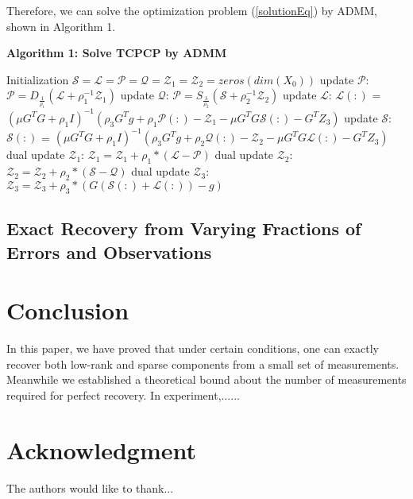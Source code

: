 \documentclass[journal,transmag]{IEEEtran}
\theoremstyle{plain}
\begin{document}
Therefore, we can solve the optimization problem (\ref{solutionEq}) by ADMM, shown in Algorithm 1.
\begin{algorithm}[!htbp]
  \caption*{\textbf{Algorithm 1: Solve TCPCP by ADMM}}
  \begin{algorithmic}[1]
    \State Initialization $\mathcal{S}=\mathcal{L}=\mathcal{P}=\mathcal{Q}=\mathcal{Z}_1=\mathcal{Z}_2=zeros(dim(X_0))$
        \State update $\mathcal{P}$: $\mathcal{P}=D_{\frac{1}{\rho_1}}(\mathcal{L}+\rho_1^{-1}\mathcal{Z}_1)$
        \State update $\mathcal{Q}$: $\mathcal{P}=S_{\frac{\lambda}{\rho_2}}(\mathcal{S}+\rho_2^{-1}\mathcal{Z}_2)$
        \State update $\mathcal{L}$: $\mathcal{L}(:)$ = $(\mu G^TG+\rho_1I)^{-1}
                                                (\rho_3 G^T g+\rho_1\mathcal{P}(:)-\mathcal{Z}_1-\mu G^TG\mathcal{S}(:)-G^TZ_3)$
        \State update $\mathcal{S}$: $\mathcal{S}(:)$ = $(\mu G^TG+\rho_1I)^{-1}
                                                (\rho_3 G^T g+\rho_2\mathcal{Q}(:)-\mathcal{Z}_2-\mu G^TG\mathcal{L}(:)-G^TZ_3)$
        \State dual update $\mathcal{Z}_1$: $\mathcal{Z}_1=\mathcal{Z}_1+\rho_1*(\mathcal{L-P})$
        \State dual update $\mathcal{Z}_2$: $\mathcal{Z}_2=\mathcal{Z}_2+\rho_2*(\mathcal{S-Q})$
        \State dual update $\mathcal{Z}_3$: $\mathcal{Z}_3=\mathcal{Z}_3+\rho_3*(G\mathcal{(S(:)+L(:))}-g)$
    \EndFor
  \end{algorithmic}
\end{algorithm}

\subsection{Exact Recovery from Varying Fractions of Errors and Observations}
\section{Conclusion}
In this paper, we have proved that under certain conditions, one can exactly recover both low-rank and sparse components from a small set of measurements. Meanwhile we established a theoretical bound about the number of measurements required for perfect recovery. In experiment,......

\section*{Acknowledgment}

The authors would like to thank...
\end{document}
